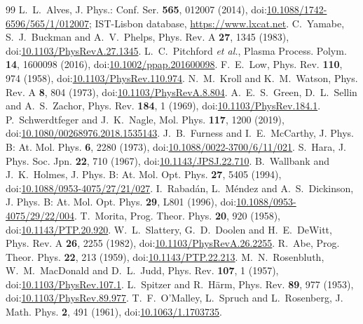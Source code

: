 \documentclass[11pt]{article}
\numberwithin{equation}{section}
\begin{document}
\begin{thebibliography}{99}
 L.~L.~Alves, J. Phys.: Conf. Ser. \textbf{565}, 012007 (2014),
doi:\href{https://doi.org/10.1088/1742-6596/565/1/012007}{10.1088/1742-6596/565/1/012007};
IST-Lisbon database, \url{https://www.lxcat.net}.
 C.~Yamabe, S.~J.~Buckman and A.~V.~Phelps, Phys. Rev. A \textbf{27}, 1345 (1983),
doi:\href{https://doi.org/10.1103/PhysRevA.27.1345}{10.1103/PhysRevA.27.1345}.
 L.~C.~Pitchford \emph{et al.}, Plasma Process. Polym. \textbf{14}, 1600098
(2016), doi:\href{https://doi.org/10.1002/ppap.201600098}{10.1002/ppap.201600098}.
 F.~E.~Low, Phys. Rev. \textbf{110}, 974 (1958),
doi:\href{https://doi.org/10.1103/PhysRev.110.974}{10.1103/PhysRev.110.974}.
 N.~M.~Kroll and K.~M.~Watson, Phys. Rev. A \textbf{8}, 804 (1973),
doi:\href{https://doi.org/10.1103/PhysRevA.8.804}{10.1103/PhysRevA.8.804}.
 A.~E.~S.~Green, D.~L.~Sellin and A.~S.~Zachor, Phys. Rev. \textbf{184}, 1 (1969),
doi:\href{https://doi.org/10.1103/PhysRev.184.1}{10.1103/PhysRev.184.1}.
 P.~Schwerdtfeger and J.~K.~Nagle, Mol. Phys. \textbf{117}, 1200 (2019),
doi:\href{https://doi.org/10.1080/00268976.2018.1535143}{10.1080/00268976.2018.1535143}.
 J.~B.~Furness and I.~E.~McCarthy, J. Phys. B: At. Mol. Phys. \textbf{6},
2280 (1973), doi:\href{https://doi.org/10.1088/0022-3700/6/11/021}{10.1088/0022-3700/6/11/021}.
 S.~Hara, J. Phys. Soc. Jpn. \textbf{22}, 710 (1967),
doi:\href{https://doi.org/10.1143/JPSJ.22.710}{10.1143/JPSJ.22.710}.
 B.~Wallbank and J.~K.~Holmes, J. Phys. B: At. Mol. Opt. Phys.
\textbf{27}, 5405 (1994),
doi:\href{https://doi.org/10.1088/0953-4075/27/21/027}{10.1088/0953-4075/27/21/027}.
 I.~Rabad\'an, L.~M\'endez and A.~S.~Dickinson, J. Phys. B: At. Mol. Opt. Phys.
\textbf{29}, L801 (1996),
doi:\href{https://doi.org/10.1088/0953-4075/29/22/004}{10.1088/0953-4075/29/22/004}.
 T.~Morita, Prog. Theor. Phys. \textbf{20}, 920 (1958),
doi:\href{https://doi.org/10.1143/PTP.20.920}{10.1143/PTP.20.920}.
 W.~L.~Slattery, G.~D.~Doolen and H.~E.~DeWitt, Phys. Rev. A \textbf{26}, 2255 (1982),
doi:\href{https://doi.org/10.1103/PhysRevA.26.2255}{10.1103/PhysRevA.26.2255}.
 R.~Abe, Prog. Theor. Phys. \textbf{22}, 213 (1959),
doi:\href{https://doi.org/10.1143/PTP.22.213}{10.1143/PTP.22.213}.
 M.~N.~Rosenbluth, W.~M.~MacDonald and D.~L.~Judd, Phys. Rev. \textbf{107}, 1 (1957),
doi:\href{https://doi.org/10.1103/PhysRev.107.1}{10.1103/PhysRev.107.1}.
 L.~Spitzer and R.~H\"arm, Phys. Rev. \textbf{89}, 977 (1953),
doi:\href{https://doi.org/10.1103/PhysRev.89.977}{10.1103/PhysRev.89.977}.
 T.~F.~O'Malley, L.~Spruch and L.~Rosenberg, J. Math. Phys. \textbf{2}, 491 (1961),
doi:\href{https://doi.org/10.1063/1.1703735}{10.1063/1.1703735}.
\end{thebibliography}
\end{document}
